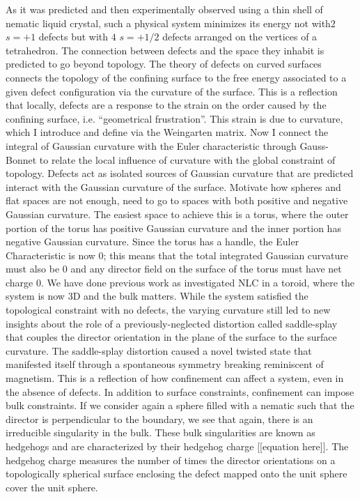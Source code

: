 As it was predicted and then experimentally observed using a thin shell of nematic liquid crystal, such a physical system minimizes its energy not with$2$ $s=+1$ defects but with $4$ $s=+1/2$ defects arranged on the vertices of a tetrahedron.
The connection between defects and the space they inhabit is predicted to go beyond topology.
The theory of defects on curved surfaces connects the topology of the confining surface to the free energy associated to a given defect configuration via the curvature of the surface.
This is a reflection that locally, defects are a response to the strain on the order caused by the confining surface, i.e. ``geometrical frustration''.
This strain is due to curvature, which I introduce and define via the Weingarten matrix.
Now I connect the integral of Gaussian curvature with the Euler characteristic through Gauss-Bonnet to relate the local influence of curvature with the global constraint of topology.
Defects act as isolated sources of Gaussian curvature that are predicted interact with the Gaussian curvature of the surface.
Motivate how spheres and flat spaces are not enough, need to go to spaces with both positive and negative Gaussian curvature.
The easiest space to achieve this is a torus, where the outer portion of the torus has positive Gaussian curvature and the inner portion has negative Gaussian curvature.
Since the torus has a handle, the Euler Characteristic is now 0; this means that the total integrated Gaussian curvature must also be 0 and any director field on the surface of the torus must have net charge 0.
We have done previous work as investigated NLC in a toroid, where the system is now 3D and the bulk matters.
While the system satisfied the topological constraint with no defects, the varying curvature still led to new insights about the role of a previously-neglected distortion called saddle-splay that couples the director orientation in the plane of the surface to the surface curvature.
The saddle-splay distortion caused a novel twisted state that manifested itself through a spontaneous symmetry breaking reminiscent of magnetism.
This is a reflection of how confinement can affect a system, even in the absence of defects.
In addition to surface constraints, confinement can impose bulk constraints.
If we consider again a sphere filled with a nematic such that the director is perpendicular to the boundary, we see that again, there is an irreducible singularity in the bulk.
These bulk singularities are known as hedgehogs and are characterized by their hedgehog charge [[equation here]].
The hedgehog charge measures the number of times the director orientations on a topologically spherical surface enclosing the defect mapped onto the unit sphere cover the unit sphere.

